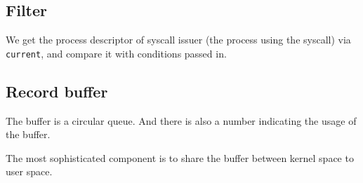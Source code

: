 \subsection{Filter}

We get the process descriptor of syscall issuer (the process using the syscall) via \texttt{current}, and compare it with conditions passed in.

\subsection{Record buffer}

The buffer is a circular queue. And there is also a number indicating the usage of the buffer. 

The most sophisticated component is to share the buffer between kernel space to user space. 